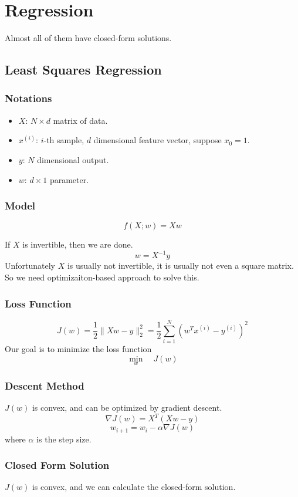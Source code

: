 \chapter{Regression}
Almost all of them have closed-form solutions.
\newpage
\section{Least Squares Regression}
\subsection{Notations}
\begin{itemize}
    \item $X$: $N \times d$ matrix of data.
    \item $x^{(i)}$: $i$-th sample, $d$ dimensional feature vector, suppose $x_0 = 1$.
    \item $y$: $N$ dimensional output.
    \item  $w$: $d \times 1$ parameter.
\end{itemize}
\subsection{Model}
\[ f(X;w) = Xw \]
\begin{remark}
    If $X$ is invertible, then we are done.
    \[ w = X^{-1}y \]
    Unfortunately $X$ is usually not invertible, it is usually not even a square matrix. So we need optimizaiton-based approach to solve this.
\end{remark}
\subsection{Loss Function}\label{section:LeastSquareLossFunc}
\[ J(w)  = \frac{1}{2}\| Xw - y \|_2^2 = \frac{1}{2}\sum_{i=1}^N(w^Tx^{(i)} - y^{(i)})^2 \]
Our goal is to minimize the loss function
\[ \min_w \quad J(w) \]
\subsection{Descent Method}
$J(w)$ is convex, and can be optimized by gradient descent.
\[ \nabla J(w) = X^T(Xw-y) \]
\[ w_{i+1} = w_i - \alpha \nabla J(w) \]
where $\alpha$ is the step size.
\subsection{Closed Form Solution}
$J(w)$ is convex, and we can calculate the closed-form solution.

